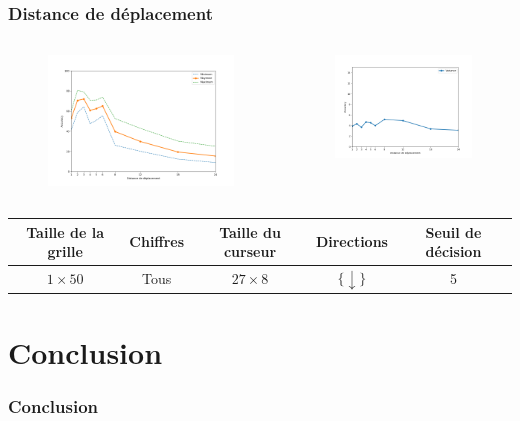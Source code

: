 \documentclass{beamer}
\begin{document}
\begin{frame}
    \frametitle{Distance de déplacement}
    \begin{columns}[c]
        \begin{column}{.5\textwidth}
            \begin{figure}
                \includegraphics[height=0.5\textheight]{movedist_acc_mean.png}
            \end{figure}
        \end{column}
        \begin{column}{.5\textwidth}
            \begin{figure}
                \includegraphics[height=0.45\textheight]{movedist_acc_std.png}
            \end{figure}
        \end{column}
    \end{columns}
    \center
    \fontsize{7pt}{7}\selectfont
    \begin{tabu}{|c|c|c|c|c|}\hline
        Taille de la grille & Chiffres & Taille du curseur & Directions & Seuil de décision \\ \hline
        $1 \times 50$ & Tous & $27 \times 8$ & $\{\downarrow\}$ & 5 \\ \hline
    \end{tabu}
    \vspace{6em}
\end{frame}

\section{Conclusion}

\begin{frame}
    \frametitle{Conclusion}
\end{frame}
\end{document}
